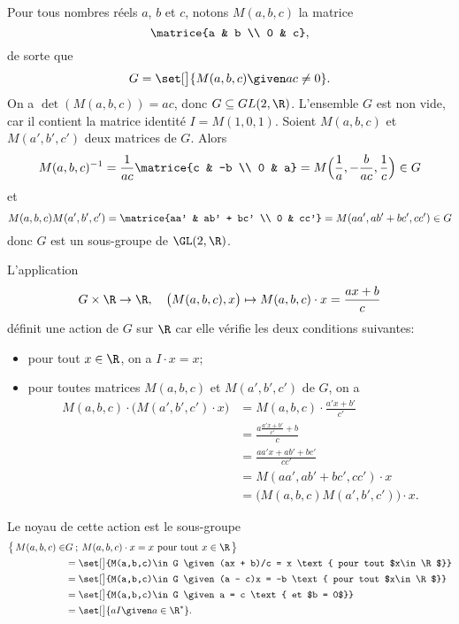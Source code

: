 Pour tous nombres réels $a$, $b$ et $c$, notons $M(a,b,c)$ la matrice 
\[
  \matrice{a & b \\ 0 & c},
\]
de sorte que
\[
  G = \set[\big]{M(a,b,c) \given ac\neq 0}.
\]
On a $\det(M(a,b,c)) = ac$, donc $G\subseteq GL(2,\R)$.
L'ensemble $G$ est non vide, car il contient la matrice identité $I = M(1,0,1)$.
Soient $M(a,b,c)$ et $M(a',b',c')$ deux matrices de $G$.
Alors
\[
  M(a,b,c)^{-1} 
    = \frac{1}{ac}\matrice{c & -b \\ 0 & a}
    = M\Bigl( \frac{1}{a}, -\frac{b}{ac}, \frac{1}{c} \Bigr)
    \in G
\]
et
\[
  M(a,b,c) M(a',b',c') 
    = \matrice{aa' & ab' + bc' \\ 0 & cc'} 
    = M(aa', ab'+bc', cc')
    \in G
\]
donc $G$ est un sous-groupe de $\GL(2,\R)$.

L'application
%
\begin{align*}
     G\times\R \to \R, \quad \bigl(M(a,b,c),x\bigr) \mapsto M(a,b,c) \cdot x =  \frac{ax+b}{c}
\end{align*}
%
définit une action de $G$ sur $\R$ car elle vérifie les deux conditions suivantes:
%
\begin{itemize}
  \item pour tout $x\in\R$, on a $I\cdot x = x$;
  \item pour toutes matrices $M(a,b,c)$ et $M(a',b',c')$ de $G$, on a
    \begin{align*}
      M(a,b,c) \cdot \bigl( M(a',b',c') \cdot x \bigr)
        &= M(a,b,c) \cdot \frac{a'x + b'}{c'} \\
        &= \frac{a\frac{a'x + b'}{c'}  + b}{c} \\
        &= \frac{aa'x + ab' + bc'}{cc'} \\
        &= M(aa', ab'+bc', cc') \cdot x \\
        &= \bigl( M(a,b,c)M(a',b',c') \bigr) \cdot x.
    \end{align*}
\end{itemize}

Le noyau de cette action est le sous-groupe
%
\[
  \begin{split}
    \bigl\{\, M(a,b,c)\in &G\:;\:M(a,b,c) \cdot x = x \text{ pour tout $x\in\R$} \,\bigr\} \\
    &= \set[\big]{M(a,b,c)\in G \given (ax + b)/c = x \text{ pour tout $x\in\R$}} \\
    &= \set[\big]{M(a,b,c)\in G \given (a - c)x = -b \text{ pour tout $x\in\R$}} \\
    &= \set[\big]{M(a,b,c)\in G \given a = c \text{ et $b = 0$}} \\
    &= \set[\big]{aI \given a\in\R^*}.
  \end{split}
\]

